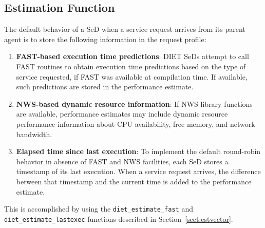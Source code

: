 \subsection{Estimation Function}\label{sect:est_fn}

The default behavior of a SeD when a service request arrives from
its parent agent is to store the following information in the
request profile:
\begin{enumerate}
\item \textbf{FAST-based execution time predictions}: DIET SeDs
  attempt to call FAST
  routines to obtain execution time predictions based on the type of
  service requested, if FAST was available at compilation time.  If
  available, such predictions are stored in the
  performance estimate.
\item \textbf{NWS-based dynamic resource information}: If NWS library
  functions are available, performance estimates may include dynamic
  resource performance information about CPU availability, free
  memory, and network bandwidth.
\item \textbf{Elapsed time since last execution}: To implement the
  default round-robin behavior in absence of FAST and NWS facilities,
  each SeD stores a timestamp of its last execution.  When a service
  request arrives, the difference between that timestamp and the
  current time is added to the performance estimate.
\end{enumerate}
This is accomplished by using the \texttt{diet\_estimate\_fast} and
\texttt{diet\_estimate\_lastexec} functions described in
Section~\ref{sect:estvector}.

